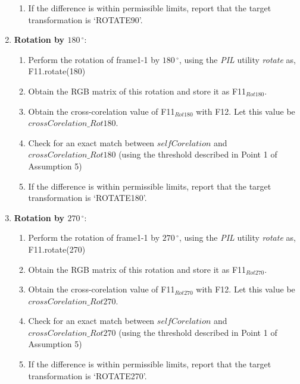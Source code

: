 \documentclass[10pt, letter]{article}
\begin{document}
\begin{enumerate}
\begin{enumerate}
	\item If the difference is within permissible limits, report that the target transformation is `ROTATE90'.
\end{enumerate}

\item \textbf{Rotation by $180\,^{\circ}$}:
\begin{enumerate}
	\item Perform the rotation of frame1-1 by $180\,^{\circ}$, using the \emph{PIL} utility \emph{rotate} \cite{pil} as,\\
		\hspace*{3cm}F11.rotate(180)
	\item Obtain the RGB matrix of this rotation and store it as F11$_{Rot180}$.
	\item Obtain the cross-corelation value of F11$_{Rot180}$ with F12. Let this value be $crossCorelation\_Rot180$.
	\item Check for an exact match between $selfCorelation$ and $crossCorelation\_Rot180$ (using the threshold described in Point 1 of Assumption 5)
	\item If the difference is within permissible limits, report that the target transformation is `ROTATE180'.
\end{enumerate}

\item \textbf{Rotation by $270\,^{\circ}$}:
\begin{enumerate}
	\item Perform the rotation of frame1-1 by $270\,^{\circ}$, using the \emph{PIL} utility \emph{rotate} \cite{pil} as,\\
		\hspace*{3cm}F11.rotate(270)
	\item Obtain the RGB matrix of this rotation and store it as F11$_{Rot270}$.
	\item Obtain the cross-corelation value of F11$_{Rot270}$ with F12. Let this value be $crossCorelation\_Rot270$.
	\item Check for an exact match between $selfCorelation$ and $crossCorelation\_Rot270$ (using the threshold described in Point 1 of Assumption 5)	
	\item If the difference is within permissible limits, report that the target transformation is `ROTATE270'.
\end{enumerate}


\end{enumerate}
\end{document}

